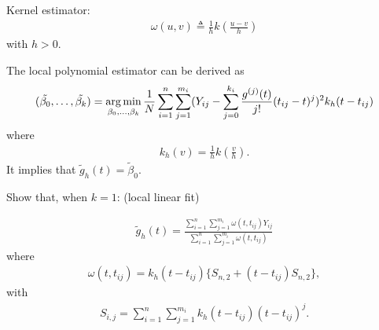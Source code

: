 \documentclass[UTF8,a4paper,10pt]{article}
\begin{document}
\begin{mybox}{}
  Kernel estimator: 
  \begin{equation*}
    \begin{aligned}
      \omega(u,v)\triangleq \frac{1}{h}k(\frac{u-v}{h})
    \end{aligned}
  \end{equation*}
  with \(h>0\).
  


\end{mybox}




  \begin{Problem}[]{}

    The local polynomial estimator can be derived as 
    \begin{equation*}
      \begin{aligned}
        (\tilde{\beta_0},\ldots,\tilde{\beta_k}) = \operatorname*{arg\,min}_{\beta_0,\ldots,\beta_k} \frac{1}{N}\sum_{i=1}^{n}\sum_{j=1}^{m_i} (Y_{ij}-\sum_{j=0}^{k_i}\frac{g^{(j)}(t)}{j!}(t_{ij}-t)^{j})^2k_{h}(t-t_{ij}) 
      \end{aligned}
    \end{equation*}
    where
    \begin{equation*}
      \begin{aligned}
        k_{h}(v) = \frac{1}{h}k(\frac{v}{h}).
      \end{aligned}
    \end{equation*}
    It implies that \(\tilde{g}_h(t) = \tilde{\beta}_0\).

    Show that, when \(k=1\): (local linear fit)

    \begin{equation*}
      \begin{aligned}
        \tilde{g}_h(t) = \frac{\sum_{i=1}^{n}\sum_{j=1}^{m_i}\omega(t,t_{ij})Y_{ij}}{\sum_{i=1}^{n}\sum_{j=1}^{m_i}\omega(t,t_{ij})}
      \end{aligned}
    \end{equation*}
    where
    \begin{equation*}
      \begin{aligned}
        \omega(t,t_{ij}) = k_h(t-t_{ij})\{S_{n,2}+(t-t_{ij})S_{n,2}\},
      \end{aligned}
    \end{equation*}
    with
    \begin{equation*}
      \begin{aligned}
        S_{i,j} = \sum_{i=1}^{n}\sum_{j=1}^{m_i} k_h(t-t_{ij})(t-t_{ij})^j.
      \end{aligned}
    \end{equation*}
  \end{Problem}
\end{document}
